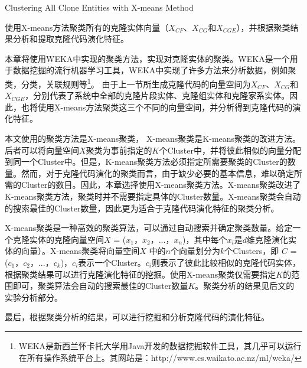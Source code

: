 {Clustering All Clone Entities with X-means Method}

使用X-means方法聚类所有的克隆实体向量（$X_{CF}$、$X_{CG}$和$X_{CGE}$），并根据聚类结果分析和提取克隆代码演化特征。

本章将使用WEKA中实现的聚类方法，实现对克隆实体的聚类。WEKA是一个用于数据挖掘的流行机器学习工具，WEKA中实现了许多方法来分析数据，例如聚类，分类，关联规则等\footnote{WEKA是新西兰怀卡托大学用Java开发的数据挖掘软件工具，其几乎可以运行在所有操作系统平台上。其网站是：http://www.cs.waikato.ac.nz/ml/weka/}。 由于上一节所生成克隆代码的向量空间为$X_{CF}$、$X_{CG}$和$X_{CGE}$，分别代表了系统中全部的克隆片段实体、克隆组实体和克隆家系实体。因此，也将使用X-means方法聚类这三个不同的向量空间，并分析得到克隆代码的演化特征。

本文使用的聚类方法是X-means聚类\cite{pelleg2000x}， X-means聚类是K-means聚类\cite{arthur2007k}的改进方法。后者可以将向量空间$X$聚类为事前指定的$K$个Cluster中，并将彼此相似的向量分配到同一个Cluster中。但是，K-means聚类方法必须指定所需要聚类的Cluster的数量。然而，对于克隆代码演化的聚类而言，由于缺少必要的基本信息，难以确定所需的Cluster的数目。因此，本章选择使用X-means聚类方法。X-means聚类改进了K-means聚类方法，聚类时并不需要指定具体的Cluster数量。X-means聚类会自动的搜索最佳的Cluster数量，因此更为适合于克隆代码演化特征的聚类分析。

X-means聚类是一种高效的聚类算法，可以通过自动搜索并确定聚类数量\cite{pelleg2000x}。给定一个克隆实体的克隆向量空间$X$ = {($x_1$，$x_2$，$...$，$x_n$)}，其中每个$x_i$是$d$维克隆演化实体的向量）。X-means聚类将向量空间$X$ 中的$n$个向量划分为$k$个Clusters，即 $C$ = {($c_1$，$c_2$，$...$，$c_k$)}，$c_i$表示一个Cluster。$c_i$则表示了彼此比较相似的克隆代码实体，根据聚类结果可以进行克隆演化特征的挖掘。使用X-means聚类仅需要指定$K$的范围即可，聚类算法会自动的搜索最佳的Cluster数量$K$。聚类分析的结果见后文的实验分析部分。

最后，根据聚类分析的结果，可以进行挖掘和分析克隆代码的演化特征。


